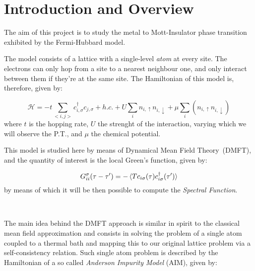 
\section{Introduction and Overview}
The aim of this project is to study the metal to Mott-Insulator phase transition exhibited by the Fermi-Hubbard model.

The model consists of a lattice with a single-level \textit{atom} at every site. The electrons can only hop from a site to a nearest neighbour one, and only interact between them if they're at the same site. The Hamiltonian of this model is, therefore, given by:

\begin{equation}
\mathcal{H} = -t\sum_{<i,j>}c_{i,\sigma}^\dagger c_{j,\sigma} + h.c.+ U\sum_i n_{i,\uparrow}n_{i,\downarrow} + \mu\sum_i (n_{i,\uparrow}n_{i,\downarrow})
\end{equation}
where $t$ is the hopping rate, $U$ the strenght of the interaction, varying which we will observe the P.T., and $\mu$ the chemical potential.




This model is studied here by means of Dynamical Mean Field Theory~(DMFT), and the quantity of interest is the local Green's function, given by:

\begin{equation}\label{orGreen's}
G_{ii}^\sigma (\tau - \tau^\prime) = -\braket{Tc_{i\sigma}(\tau)c_{i\sigma}^\dagger(\tau^\prime)} 
\end{equation}
by means of which it will be then possible to compute the \emph{Spectral Function}.

~

The main idea behind the DMFT approach is similar in spirit to the classical mean field approximation and consists in solving the problem of a single atom coupled to a thermal bath and mapping this to our original lattice problem via a self-consistency relation.
Such single atom problem is described by the Hamiltonian of a so called \emph{Anderson Impurity Model} (AIM), given by:

